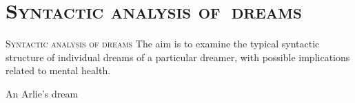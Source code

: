 \documentclass[xcolor=x11names,compress]{beamer}
\begin{document}
\section{\scshape Syntactic analysis of~dreams}
{
\begin{frame}[c]{}
    \centering
    {\scshape \LARGE \color{redUnicam} Syntactic analysis of dreams} \newline \newline
    {The aim is to examine the typical syntactic structure of individual dreams of a particular dreamer,
    with possible implications related to mental health.}
\end{frame}}

{
\begin{frame}[t]{An Arlie's dream}
    \vspace{-0.2cm}
    
\end{frame}}
\end{document}
